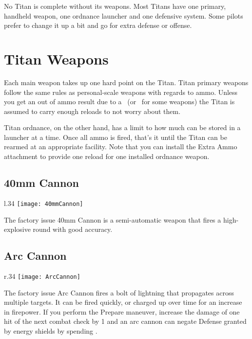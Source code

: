 No Titan is complete without its weapons. Most Titans have one primary, handheld weapon, one ordnance launcher and one defensive system. Some pilots prefer to change it up a bit and go for extra defense or offense. 

\section{Titan Weapons}

Each main weapon takes up one hard point on the Titan. Titan primary weapons follow the same rules as personal-scale weapons with regards to ammo. Unless you get an out of ammo result due to a \Despair\ (or \Threat\Threat\Threat\ for some weapons) the Titan is assumed to carry enough reloads to not worry about them.

Titan ordnance, on the other hand, has a limit to how much can be stored in a launcher at a time. Once all ammo is fired, that's it until the Titan can be rearmed at an appropriate facility. Note that you can install the Extra Ammo attachment to provide one reload for one installed ordnance weapon.

\subsection{40mm Cannon}

\begin{wrapfigure}[3]{l}{.34\linewidth}
\vspace*{-2em}
\texttt{[image: 40mmCannon]}
\end{wrapfigure}

The factory issue 40mm Cannon is a semi-automatic weapon that fires a high-explosive round with good accuracy. 

\subsection{Arc Cannon}
\begin{wrapfigure}[4]{r}{.34\linewidth}
\vspace*{-2em}
\texttt{[image: ArcCannon]}
\end{wrapfigure}

The factory issue Arc Cannon fires a bolt of lightning that propagates across multiple targets. It can be fired quickly, or charged up over time for an increase in firepower. If you perform the Prepare maneuver, increase the damage of one hit of the next combat check by 1 and an arc cannon can negate Defense granted by energy shields by spending \Advantage\Advantage.

